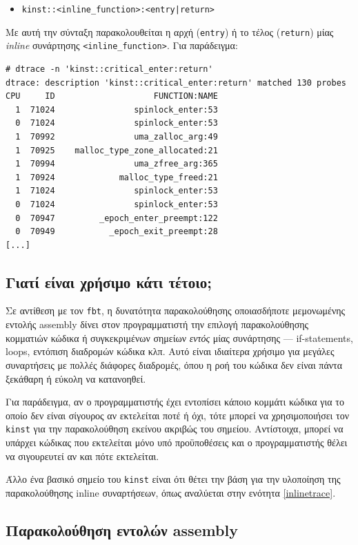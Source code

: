 \documentclass[12pt]{article}
\begin{document}
\begin{itemize}
	\item \lstinline{kinst::<inline_function>:<entry|return>}
\end{itemize}

Με αυτή την σύνταξη παρακολουθείται η αρχή (\lstinline{entry}) ή το τέλος
(\lstinline{return}) μίας \textit{inline} συνάρτησης
\lstinline{<inline_function>}. Για παράδειγμα:

\begin{lstlisting}
# dtrace -n 'kinst::critical_enter:return'
dtrace: description 'kinst::critical_enter:return' matched 130 probes
CPU     ID                    FUNCTION:NAME
  1  71024                spinlock_enter:53
  0  71024                spinlock_enter:53
  1  70992                uma_zalloc_arg:49
  1  70925    malloc_type_zone_allocated:21
  1  70994                uma_zfree_arg:365
  1  70924             malloc_type_freed:21
  1  71024                spinlock_enter:53
  0  71024                spinlock_enter:53
  0  70947         _epoch_enter_preempt:122
  0  70949           _epoch_exit_preempt:28
[...]
\end{lstlisting}

\subsection{Γιατί είναι χρήσιμο κάτι τέτοιο;}

Σε αντίθεση με τον \lstinline{fbt}, η δυνατότητα παρακολούθησης οποιασδήποτε
μεμονωμένης εντολής assembly δίνει στον προγραμματιστή την επιλογή
παρακολούθησης κομματιών κώδικα ή συγκεκριμένων σημείων \textit{εντός} μίας
συνάρτησης --- if-statements, loops, εντόπιση διαδρομών κώδικα κλπ. Αυτό είναι
ιδιαίτερα χρήσιμο για μεγάλες συναρτήσεις με πολλές διάφορες διαδρομές, όπου η
ροή του κώδικα δεν είναι πάντα ξεκάθαρη ή εύκολη να κατανοηθεί.

Για παράδειγμα, αν ο προγραμματιστής έχει εντοπίσει κάποιο κομμάτι κώδικα για
το οποίο δεν είναι σίγουρος αν εκτελείται ποτέ ή όχι, τότε μπορεί να
χρησιμοποιήσει τον \lstinline{kinst} για την παρακολούθηση εκείνου ακριβώς του
σημείου. Αντίστοιχα, μπορεί να υπάρχει κώδικας που εκτελείται μόνο υπό
προϋποθέσεις και ο προγραμματιστής θέλει να σιγουρευτεί αν και πότε εκτελείται.

Άλλο ένα βασικό σημείο του \lstinline{kinst} είναι ότι θέτει την βάση για την
υλοποίηση της παρακολούθησης inline συναρτήσεων, όπως αναλύεται στην ενότητα
\ref{inlinetrace}.

\subsection{Παρακολούθηση εντολών assembly} \label{instrumentation}
\end{document}
